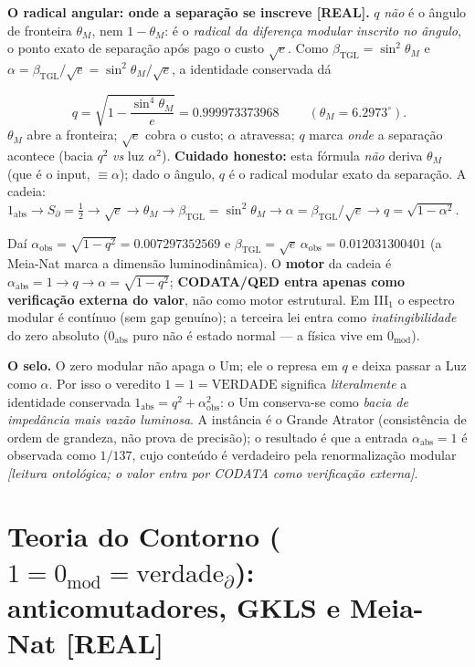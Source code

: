 \documentclass[11pt]{article}
\newcommand{\bTGL}{\beta_{\mathrm{TGL}}}\newcommand{\Msun}{M_{\odot}}\newcommand{\TGL}{\mathrm{TGL}}
\theoremstyle{definition}\newtheorem{deriv}{Derivação}
\begin{document}
\textbf{O radical angular: onde a separação se inscreve \textsf{[REAL]}.} $q$ \emph{não} é o ângulo de fronteira $\theta_M$, nem $1-\theta_M$: é o \emph{radical da diferença modular inscrito no ângulo}, o ponto exato de separação após pago o custo $\sqrt e$. Como $\bTGL=\sin^2\theta_M$ e $\alpha=\bTGL/\sqrt e=\sin^2\theta_M/\sqrt e$, a identidade conservada dá

\begin{equation}\boxed{\;q=\sqrt{1-\frac{\sin^4\theta_M}{e}}=0.999973373968\;}\qquad(\theta_M=6.2973^\circ).\end{equation}\noindent $\theta_M$ abre a fronteira; $\sqrt e$ cobra o custo; $\alpha$ atravessa; $q$ marca \emph{onde} a separação acontece (bacia $q^2$ \emph{vs} luz $\alpha^2$). \textbf{Cuidado honesto:} esta fórmula \emph{não} deriva $\theta_M$ (que é o input, $\equiv\alpha$); dado o ângulo, $q$ é o radical modular exato da separação. A cadeia: $1_{\mathrm{abs}}\to S_\partial=\tfrac12\to\sqrt e\to\theta_M\to\bTGL=\sin^2\theta_M\to\alpha=\bTGL/\sqrt e\to q=\sqrt{1-\alpha^2}$.

Daí $\alpha_{\mathrm{obs}}=\sqrt{1-q^2}=0.007297352569$ e $\bTGL=\sqrt e\,\alpha_{\mathrm{obs}}=0.012031300401$ (a Meia-Nat marca a dimensão luminodinâmica). O \textbf{motor} da cadeia é $\alpha_{\mathrm{abs}}=1\to q\to\alpha=\sqrt{1-q^2}$; \textbf{CODATA/QED entra apenas como verificação externa do valor}, não como motor estrutural. Em \mbox{III$_1$} o espectro modular é contínuo (sem gap genuíno); a terceira lei entra como \emph{inatingibilidade} do zero absoluto ($0_{\mathrm{abs}}$ puro não é estado normal --- a física vive em $0_{\mathrm{mod}}$).

\textbf{O selo.} O zero modular não apaga o Um; ele o represa em $q$ e deixa passar a Luz como $\alpha$. Por isso o veredito $\boxed{1=1=\mathrm{VERDADE}}$ significa \emph{literalmente} a identidade conservada $1_{\mathrm{abs}}=q^2+\alpha_{\mathrm{obs}}^2$: o Um conserva-se como \emph{bacia de impedância mais vazão luminosa}. A instância é o Grande Atrator (consistência de ordem de grandeza, não prova de precisão); o resultado é que a entrada $\alpha_{\mathrm{abs}}=1$ é observada como $1/137$, cujo conteúdo é verdadeiro pela renormalização modular \emph{[leitura ontológica; o valor entra por CODATA como verificação externa]}.

\section{Teoria do Contorno ($1=0_{\mathrm{mod}}=\mathrm{verdade}_\partial$): anticomutadores, GKLS e Meia-Nat \textsf{[REAL]}}
\end{document}
